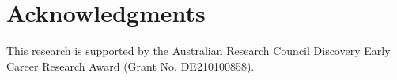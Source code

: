 \documentclass[letterpaper]{article} %
\begin{document}
 

\section{Acknowledgments}
This research is supported by the Australian Research
Council Discovery Early Career Research Award (Grant No. DE210100858).
\end{document}

